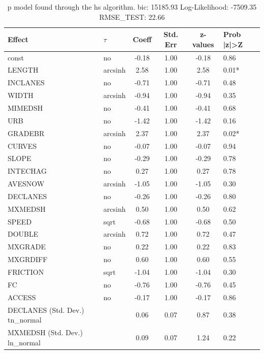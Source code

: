\begin{table}
	\caption{p model found through the hs algorithm. bic: 15185.93 Log-Likelihood: -7509.35 RMSE_TEST: 22.66}
	\begin{center}
		\begin{tabular}{|l|l|c|c|c|l|}
			\hline
			Effect & $\tau$ & Coeff & Std. Err & z-values & Prob |z|>Z \\
			\hline
			const & no & -0.18 & 1.00 & -0.18 & 0.86 \\
			\hline
			LENGTH & arcsinh & 2.58 & 1.00 & 2.58 & 0.01* \\
			\hline
			INCLANES & no & -0.71 & 1.00 & -0.71 & 0.48 \\
			\hline
			WIDTH & arcsinh & -0.94 & 1.00 & -0.94 & 0.35 \\
			\hline
			MIMEDSH & no & -0.41 & 1.00 & -0.41 & 0.68 \\
			\hline
			URB & no & -1.42 & 1.00 & -1.42 & 0.16 \\
			\hline
			GRADEBR & arcsinh & 2.37 & 1.00 & 2.37 & 0.02* \\
			\hline
			CURVES & no & -0.07 & 1.00 & -0.07 & 0.94 \\
			\hline
			SLOPE & no & -0.29 & 1.00 & -0.29 & 0.78 \\
			\hline
			INTECHAG & no & 0.27 & 1.00 & 0.27 & 0.78 \\
			\hline
			AVESNOW & arcsinh & -1.05 & 1.00 & -1.05 & 0.30 \\
			\hline
			DECLANES & no & -0.26 & 1.00 & -0.26 & 0.80 \\
			\hline
			MXMEDSH & arcsinh & 0.50 & 1.00 & 0.50 & 0.62 \\
			\hline
			SPEED & sqrt & -0.68 & 1.00 & -0.68 & 0.50 \\
			\hline
			DOUBLE & arcsinh & 0.72 & 1.00 & 0.72 & 0.47 \\
			\hline
			MXGRADE & no & 0.22 & 1.00 & 0.22 & 0.83 \\
			\hline
			MXGRDIFF & no & 0.60 & 1.00 & 0.60 & 0.55 \\
			\hline
			FRICTION & sqrt & -1.04 & 1.00 & -1.04 & 0.30 \\
			\hline
			FC & no & -0.76 & 1.00 & -0.76 & 0.45 \\
			\hline
			ACCESS & no & -0.17 & 1.00 & -0.17 & 0.86 \\
			\hline
			DECLANES (Std. Dev.) tn_normal &  & 0.06 & 0.07 & 0.87 & 0.38 \\
			\hline
			MXMEDSH (Std. Dev.) ln_normal &  & 0.09 & 0.07 & 1.24 & 0.22 \\

\end{tabular}
\end{center}
\end{table}
